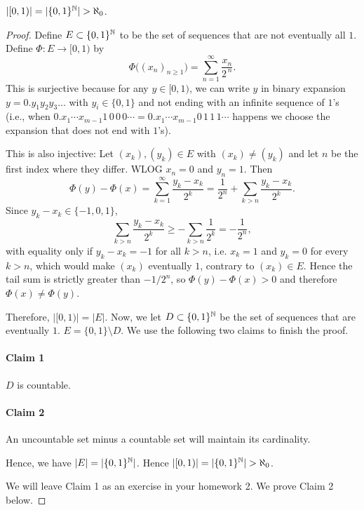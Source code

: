 \begin{corollary}
  $|[0,1)|=|\{0,1\}^{\N}|>\aleph_0$.
\end{corollary}
\begin{proof}
  Define $E\subset \{0,1\}^{\mathbb{N}}$ to be the set of sequences that are not eventually all $1$. Define $\Phi:E\to[0,1)$ by
  \[
  \Phi\bigl((x_n)_{n\ge1}\bigr)=\sum_{n=1}^\infty \frac{x_n}{2^{\,n}}.
  \]
  This is surjective because for any $y\in[0,1)$, we can write $y$ in binary expansion $y=0.y_1y_2y_3\ldots$ with $y_i\in\{0,1\}$ and not ending with an infinite sequence of $1$'s (i.e., when $0.x_1\cdots x_{m-1}1\,0\,0\,0\cdots = 0.x_1\cdots x_{m-1}0\,1\,1\,1\cdots$ happens we choose the expansion that does not end with $1$'s). 
  
  This is also injective: 
  Let $(x_k),(y_k)\in E$ with $(x_k)\ne(y_k)$ and let $n$ be the first index where they differ. WLOG $x_n=0$ and $y_n=1$. Then
  \[
  \Phi(y)-\Phi(x)=\sum_{k=1}^{\infty}\frac{y_k-x_k}{2^k}
  =\frac{1}{2^n}+\sum_{k>n}\frac{y_k-x_k}{2^k}.
  \]
  Since $y_k-x_k\in\{-1,0,1\}$,
  \[
  \sum_{k>n}\frac{y_k-x_k}{2^k}\ge -\sum_{k>n}\frac{1}{2^k}=-\frac{1}{2^n},
  \]
  with equality only if $y_k-x_k=-1$ for all $k>n$, i.e. $x_k=1$ and $y_k=0$ for every $k>n$, which would make $(x_k)$ eventually $1$, contrary to $(x_k)\in E$. Hence the tail sum is strictly greater than $-1/2^n$, so $\Phi(y)-\Phi(x)>0$ and therefore $\Phi(x)\ne\Phi(y)$. 

Therefore, $|[0,1)|=|E|$. Now, we let $D\subset \{0,1\}^{\mathbb{N}}$ be the set of sequences that are eventually $1$. $E=\{0,1\}\setminus D$. We use the following two claims to finish the proof.
  
  \paragraph{Claim 1} $D$ is countable.

  \paragraph{Claim 2} An uncountable set minus a countable set will maintain its cardinality.

  Hence, we have $|E|=|\{0,1\}^{\mathbb{N}}|$. Hence $|[0,1)|=|\{0,1\}^{\N}|>\aleph_0$.

  We will leave Claim 1 as an exercise in your homework 2. We prove Claim 2 below.
\end{proof}



